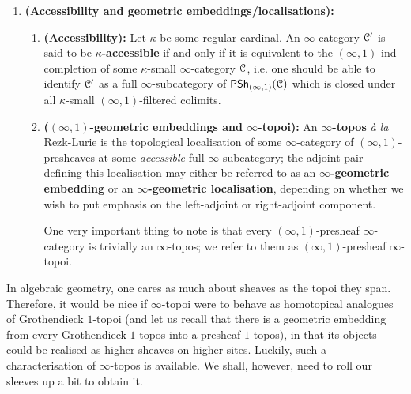 \begin{definition}
\begin{enumerate}
\begin{enumerate}
                                A localisation that is \textit{exact} shall be called a \textbf{topological localisation}. 
                            \end{enumerate}
                        \item \textbf{(Accessibility and geometric embeddings/localisations):}
                            \begin{enumerate}
                                \item \textbf{(Accessibility):} Let $\kappa$ be some \href{https://ncatlab.org/nlab/show/regular+cardinal}{\underline{regular cardinal}}. An $\infty$-category $\mathcal{C}'$ is said to be \textbf{$\kappa$-accessible} if and only if it is equivalent to the $(\infty, 1)$-ind-completion of some $\kappa$-small $\infty$-category $\mathcal{C}$, i.e. one should be able to identify $\mathcal{C}'$ as a full $\infty$-subcategory of $\mathsf{PSh}_{(\infty, 1)}(\mathcal{C})$ which is closed under all $\kappa$-small $(\infty, 1)$-filtered colimits.
                                \item \textbf{($(\infty, 1)$-geometric embeddings and $\infty$-topoi):} An \textbf{$\infty$-topos} \textit{\`a la} Rezk-Lurie is the topological localisation of some $\infty$-category of $(\infty, 1)$-presheaves at some \textit{accessible} full $\infty$-subcategory; the adjoint pair defining this localisation may either be referred to as an \textbf{$\infty$-geometric embedding} or an \textbf{$\infty$-geometric localisation}, depending on whether we wish to put emphasis on the left-adjoint or right-adjoint component.
                                
                                One very important thing to note is that every $(\infty, 1)$-presheaf $\infty$-category is trivially an $\infty$-topos; we refer to them as $(\infty, 1)$-presheaf $\infty$-topoi. 
                            \end{enumerate}
                    \end{enumerate}
                \end{definition}
                
                In algebraic geometry, one cares as much about sheaves as the topoi they span. Therefore, it would be nice if $\infty$-topoi were to behave as homotopical analogues of Grothendieck $1$-topoi (and let us recall that there is a geometric embedding from every Grothendieck $1$-topos into a presheaf $1$-topos), in that its objects could be realised as higher sheaves on higher sites. Luckily, such a characterisation of $\infty$-topos is available. We shall, however, need to roll our sleeves up a bit to obtain it.
                
